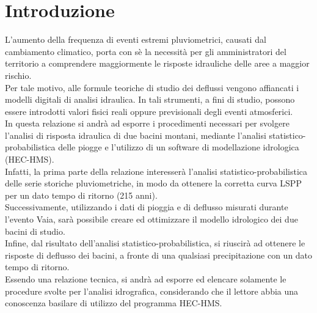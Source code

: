\section{Introduzione}
L'aumento della frequenza di eventi estremi pluviometrici, causati dal cambiamento climatico, porta con sè la necessità per gli amministratori del territorio a comprendere maggiormente le risposte idrauliche delle aree a maggior rischio.\\
Per tale motivo, alle formule teoriche di studio dei deflussi vengono affiancati i modelli digitali di analisi idraulica. In tali strumenti, a fini di studio, possono essere introdotti valori fisici reali oppure previsionali degli eventi atmosferici.\\ 
In questa relazione si andrà ad esporre i procedimenti necessari per svolgere l'analisi di risposta idraulica di due bacini montani, mediante l'analisi statistico-probabilistica delle piogge e l'utilizzo di un software di modellazione idrologica (HEC-HMS).\\
Infatti, la prima parte della relazione interesserà l'analisi statistico-probabilistica delle serie storiche pluviometriche, in modo da ottenere la corretta curva LSPP per un dato tempo di ritorno (215 anni).\\
Successivamente, utilizzando i dati di pioggia e di deflusso misurati durante l'evento Vaia, sarà possibile creare ed ottimizzare il modello idrologico dei due bacini di studio.\\
Infine, dal risultato dell'analisi statistico-probabilistica, si riuscirà ad ottenere le risposte di deflusso dei bacini, a fronte di una qualsiasi precipitazione con un dato tempo di ritorno.\\
Essendo una relazione tecnica, si andrà ad esporre ed elencare solamente le procedure svolte per l'analisi idrografica, considerando che il lettore abbia una conoscenza basilare di utilizzo del programma HEC-HMS.